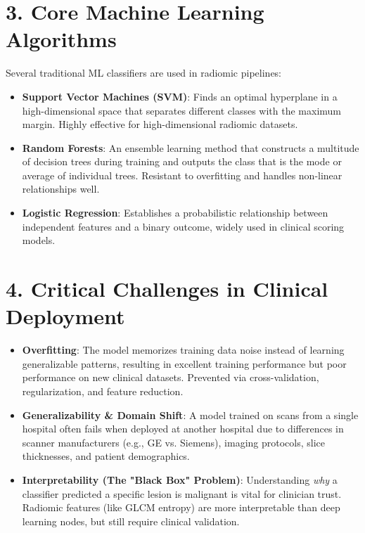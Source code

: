 \section*{3. Core Machine Learning Algorithms}
Several traditional ML classifiers are used in radiomic pipelines:

\begin{itemize}
    \item \textbf{Support Vector Machines (SVM)}: Finds an optimal hyperplane in a high-dimensional space that separates different classes with the maximum margin. Highly effective for high-dimensional radiomic datasets.
    \item \textbf{Random Forests}: An ensemble learning method that constructs a multitude of decision trees during training and outputs the class that is the mode or average of individual trees. Resistant to overfitting and handles non-linear relationships well.
    \item \textbf{Logistic Regression}: Establishes a probabilistic relationship between independent features and a binary outcome, widely used in clinical scoring models.
\end{itemize}


\section*{4. Critical Challenges in Clinical Deployment}
\begin{itemize}
    \item \textbf{Overfitting}: The model memorizes training data noise instead of learning generalizable patterns, resulting in excellent training performance but poor performance on new clinical datasets. Prevented via cross-validation, regularization, and feature reduction.
    \item \textbf{Generalizability \& Domain Shift}: A model trained on scans from a single hospital often fails when deployed at another hospital due to differences in scanner manufacturers (e.g., GE vs. Siemens), imaging protocols, slice thicknesses, and patient demographics.
    \item \textbf{Interpretability (The "Black Box" Problem)}: Understanding \textit{why} a classifier predicted a specific lesion is malignant is vital for clinician trust. Radiomic features (like GLCM entropy) are more interpretable than deep learning nodes, but still require clinical validation.
\end{itemize}

\clearpage
